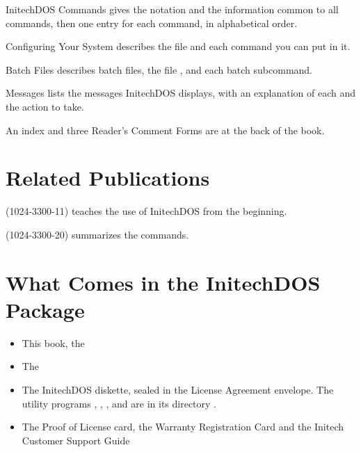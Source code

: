 InitechDOS Commands gives the notation and the
information common to all commands, then one entry for each command, in
alphabetical order.

Configuring Your System describes the 
file and each command you can put in it.

Batch Files describes batch files, the file
, and each batch subcommand.

Messages lists the messages InitechDOS displays, with
an explanation of each and the action to take.

An index and three Reader's Comment Forms are at the back of the book.

\section{Related Publications}
(1024-3300-11) teaches the use of InitechDOS from the beginning.

(1024-3300-20) summarizes the commands.

\section{What Comes in the InitechDOS Package}
\begin{itemize}
\item This book, the 
\item The 
\item The InitechDOS diskette, sealed in the License Agreement envelope.
  The utility programs , , , 
  and  are in its directory .
\item The Proof of License card, the Warranty Registration Card and the
  Initech Customer Support Guide
\end{itemize}
